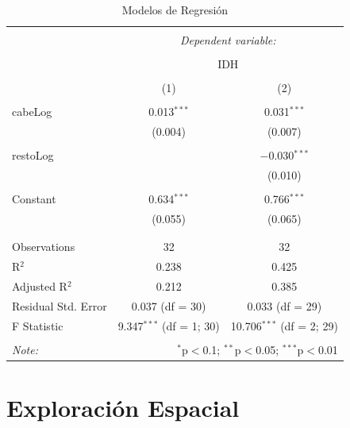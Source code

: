 \documentclass{article}
\begin{document}
\begin{table}[!htbp] \centering 
  \caption{Modelos de Regresión} 
  \label{regresiones} 
\begin{tabular}{@{\extracolsep{5pt}}lcc} 
\\[-1.8ex]\hline 
\hline \\[-1.8ex] 
 & \multicolumn{2}{c}{\textit{Dependent variable:}} \\ 
\cline{2-3} 
\\[-1.8ex] & \multicolumn{2}{c}{IDH} \\ 
\\[-1.8ex] & (1) & (2)\\ 
\hline \\[-1.8ex] 
 cabeLog & 0.013$^{***}$ & 0.031$^{***}$ \\ 
  & (0.004) & (0.007) \\ 
  & & \\ 
 restoLog &  & $-$0.030$^{***}$ \\ 
  &  & (0.010) \\ 
  & & \\ 
 Constant & 0.634$^{***}$ & 0.766$^{***}$ \\ 
  & (0.055) & (0.065) \\ 
  & & \\ 
\hline \\[-1.8ex] 
Observations & 32 & 32 \\ 
R$^{2}$ & 0.238 & 0.425 \\ 
Adjusted R$^{2}$ & 0.212 & 0.385 \\ 
Residual Std. Error & 0.037 (df = 30) & 0.033 (df = 29) \\ 
F Statistic & 9.347$^{***}$ (df = 1; 30) & 10.706$^{***}$ (df = 2; 29) \\ 
\hline 
\hline \\[-1.8ex] 
\textit{Note:}  & \multicolumn{2}{r}{$^{*}$p$<$0.1; $^{**}$p$<$0.05; $^{***}$p$<$0.01} \\ 
\end{tabular} 
\end{table} 


\section{Exploración Espacial}
\end{document}
